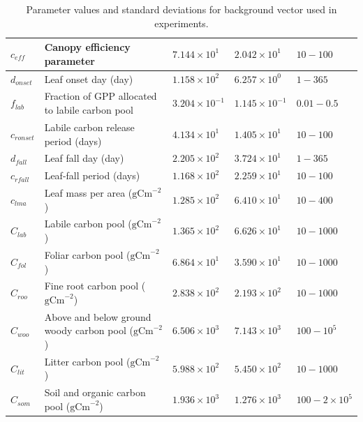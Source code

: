 \documentclass[review]{elsarticle}
\begin{document}
\begin{table}[ht]
\begin{center}
\begin{tabular}{| l | l | l | l | l |}
$c_{eff}$ & Canopy efficiency parameter & $7.144\times 10^{1}$ & $2.042\times 10^{1}$ & $10 - 100$ \\ \hline
$d_{onset}$ & Leaf onset day (day) & $1.158\times 10^{2}$ & $6.257\times 10^{0}$ & $1 - 365$ \\ \hline
$f_{lab}$ & Fraction of GPP allocated to labile carbon pool & $3.204\times 10^{-1}$ & $1.145\times 10^{-1}$ & $0.01 - 0.5$ \\ \hline
$c_{ronset}$ & Labile carbon release period (days) & $4.134\times 10^{1}$ & $1.405\times 10^{1}$ & $10 - 100$ \\ \hline
$d_{fall}$ & Leaf fall day (day) & $2.205\times 10^{2}$ & $3.724\times 10^{1}$ & $1 - 365$ \\ \hline
$c_{rfall}$ & Leaf-fall period (days) & $1.168\times 10^{2}$ & $2.259\times 10^{1}$ & $10 - 100$ \\ \hline
$c_{lma}$ & Leaf mass per area ($\text{gCm}^{-2}$) & $1.285\times 10^{2}$ & $6.410\times 10^{1}$ & $10 - 400$ \\ \hline
$C_{lab}$ & Labile carbon pool ($\text{gCm}^{-2}$) & $1.365\times 10^{2}$ & $6.626\times 10^{1}$ & $10 - 1000$ \\ \hline
$C_{fol}$ & Foliar carbon pool ($\text{gCm}^{-2}$) & $6.864\times 10^{1}$ & $3.590\times 10^{1}$ & $10 - 1000$ \\ \hline
$C_{roo}$ & Fine root carbon pool ($\text{gCm}^{-2}$) & $2.838\times 10^{2}$ & $2.193\times 10^{2}$ & $10 - 1000$ \\ \hline
$C_{woo}$ & Above and below ground woody carbon pool ($\text{gCm}^{-2}$) & $6.506\times 10^{3}$ & $7.143\times 10^{3}$ & $100 - 10^{5}$ \\ \hline
$C_{lit}$ & Litter carbon pool ($\text{gCm}^{-2}$) & $5.988\times 10^{2}$ & $5.450\times 10^{2}$ & $10 - 1000$ \\ \hline
$C_{som}$ & Soil and organic carbon pool ($\text{gCm}^{-2}$) & $1.936\times 10^{3}$ & $1.276\times 10^{3}$ & $100 - 2 \times 10^{5}$  \\ \hline
	\end{tabular}
	\caption{Parameter values and standard deviations for background vector used in experiments.}
	\label{table:xbvars}
\end{center} 
\end{table}
\end{document}
